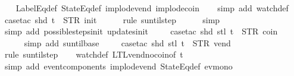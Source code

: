 \begin{isabellebody}
{\ \ \isamarkupfalse%
\ LabelEq{\isacharunderscore}def\ StateEq{\isacharunderscore}def\ implode{\isacharunderscore}vend\ implode{\isacharunderscore}coin\isanewline
\ \ \isamarkupfalse%
\ {\isacharparenleft}simp\ add{\isacharcolon}\ watch{\isacharunderscore}def{\isacharparenright}\isanewline
\ \ \isamarkupfalse%
\ {\isacharparenleft}case{\isacharunderscore}tac\ {\isachardoublequoteopen}shd\ t\ {\isacharequal}\ {\isacharparenleft}STR\ {\isacharprime}{\isacharprime}init{\isacharprime}{\isacharprime}{\isacharcomma}\ {\isacharbrackleft}{\isacharbrackright}{\isacharparenright}{\isachardoublequoteclose}{\isacharparenright}\isanewline
\ \ \ \isamarkupfalse%
\ {\isacharparenleft}rule\ suntil{\isachardot}step{\isacharparenright}\isanewline
\ \ \ \ \isamarkupfalse%
\ simp\isanewline
\ \ \ \isamarkupfalse%
\ {\isacharparenleft}simp\ add{\isacharcolon}\ possible{\isacharunderscore}steps{\isacharunderscore}init\ updates{\isacharunderscore}init{\isacharparenright}\isanewline
\ \ \ \isamarkupfalse%
\ {\isacharparenleft}case{\isacharunderscore}tac\ {\isachardoublequoteopen}shd\ {\isacharparenleft}stl\ t{\isacharparenright}\ {\isacharequal}\ {\isacharparenleft}STR\ {\isacharprime}{\isacharprime}coin{\isacharprime}{\isacharprime}{\isacharcomma}\ {\isacharbrackleft}{\isacharbrackright}{\isacharparenright}{\isachardoublequoteclose}{\isacharparenright}\isanewline
\ \ \ \ \isamarkupfalse%
\ {\isacharparenleft}simp\ add{\isacharcolon}\ suntil{\isachardot}base{\isacharparenright}\isanewline
\ \ \ \isamarkupfalse%
\ {\isacharparenleft}case{\isacharunderscore}tac\ {\isachardoublequoteopen}shd\ {\isacharparenleft}stl\ t{\isacharparenright}\ {\isacharequal}\ {\isacharparenleft}STR\ {\isacharprime}{\isacharprime}vend{\isacharprime}{\isacharprime}{\isacharcomma}\ {\isacharbrackleft}{\isacharbrackright}{\isacharparenright}{\isachardoublequoteclose}{\isacharparenright}\isanewline
\ \ \ \ \isamarkupfalse%
\ {\isacharparenleft}rule\ suntil{\isachardot}step{\isacharparenright}\isanewline
\ \ \isamarkupfalse%
\ watch{\isacharunderscore}def\ LTL{\isacharunderscore}vend{\isacharunderscore}no{\isacharunderscore}coin{\isacharbrackleft}of\ t{\isacharbrackright}\isanewline
\ \ \ \ \ \isamarkupfalse%
\ {\isacharparenleft}simp\ add{\isacharcolon}\ event{\isacharunderscore}components\ implode{\isacharunderscore}vend\ StateEq{\isacharunderscore}def\ ev{\isacharunderscore}mono{\isacharparenright}\isanewline
}
\end{isabellebody}
